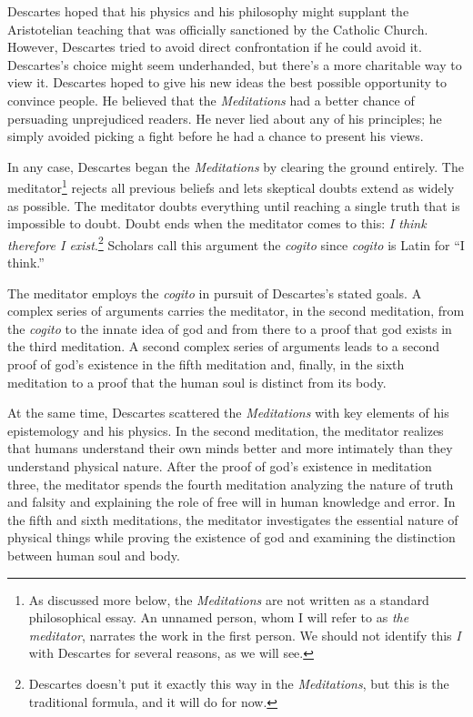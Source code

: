 Descartes hoped that his physics and his philosophy might supplant the Aristotelian teaching that was officially sanctioned by the Catholic Church. However, Descartes tried to avoid direct confrontation if he could avoid it. Descartes's choice might seem underhanded, but there's a more charitable way to view it. Descartes hoped to give his new ideas the best possible opportunity to convince people. He believed that the \textit{Meditations} had a better chance of persuading unprejudiced readers. He never lied about any of his principles; he simply avoided picking a fight before he had a chance to present his views.

In any case, Descartes began the \textit{Meditations} by clearing the ground entirely. The meditator\footnote{As discussed more below, the \textit{Meditations} are not written as a standard philosophical essay. An unnamed person, whom I will refer to as \textit{the meditator}, narrates the work in the first person. We should not identify this \textit{I} with Descartes for several reasons, as we will see.} rejects all previous beliefs and lets skeptical doubts extend as widely as possible. The meditator doubts everything until reaching a single truth that is impossible to doubt. Doubt ends when the meditator comes to this: \textit{I think therefore I exist}.\footnote{Descartes doesn't put it exactly this way in the \textit{Meditations}, but this is the traditional formula, and it will do for now.} Scholars call this argument the \textit{cogito} since \textit{cogito} is Latin for ``I think.''

The meditator employs the \textit{cogito} in pursuit of Descartes's stated goals. A complex series of arguments carries the meditator, in the second meditation, from the \textit{cogito} to the innate idea of god and from there to a proof that god exists in the third meditation. A second complex series of arguments leads to a second proof of god's existence in the fifth meditation and, finally, in the sixth meditation to a proof that the human soul is distinct from its body.

At the same time, Descartes scattered the \textit{Meditations} with key elements of his epistemology and his physics. In the second meditation, the meditator realizes that humans understand their own minds better and more intimately than they understand physical nature. After the proof of god's existence in meditation three, the meditator spends the fourth meditation analyzing the nature of truth and falsity and explaining the role of free will in human knowledge and error. In the fifth and sixth meditations, the meditator investigates the essential nature of physical things while proving the existence of god and examining the distinction between human soul and body.

